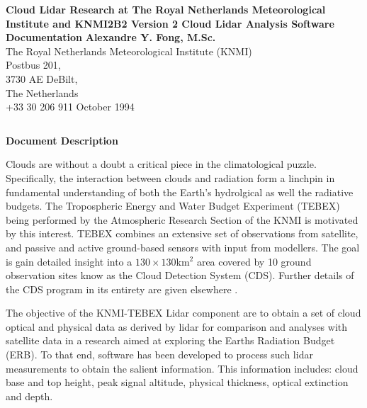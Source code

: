 
%



\setcounter{page}{3}
\pagestyle {empty}
$\;$
\begin {center}
\vspace{2 cm}
{\Large\bf
Cloud Lidar Research at The Royal Netherlands Meteorological Institute
and KNMI2B2 Version 2 Cloud Lidar Analysis Software Documentation}
\vfill
{\large \bf Alexandre Y. Fong, M.Sc.}\\
\vfill
\vfill
{\large The Royal Netherlands Meteorological Institute (KNMI)}\\
\vfill
{\large Postbus 201,\\
	3730 AE DeBilt,\\
	The Netherlands}\\
{\large +33 30 206 911}
\vfill
\vfill
{\large October 1994} \\
\end {center}
\vspace {1 cm}
$\;$
\clearpage

\pagestyle {headings}
\begin {Large}
\begin {center}
{\bf Document Description}
\end {center}
\end {Large}
\vspace{1 cm}

Clouds are without a doubt a critical piece in the climatological puzzle.
Specifically, the interaction between clouds and radiation form a
linchpin in fundamental understanding of both the
Earth's hydrolgical as well the radiative budgets. The Tropospheric
Energy and Water Budget Experiment (TEBEX) being performed by the
Atmospheric Research Section of the KNMI is motivated by this
interest. TEBEX combines an extensive set of observations from 
satellite, and passive and active ground-based sensors with input
from modellers. The goal is gain detailed insight into a 
$130{\times}130$km$^{2}$
area covered by 10 ground observation sites know as the Cloud Detection
System (CDS). Further details of the CDS program in its entirety are
given elsewhere \cite{psajfacapvlgjp}. 

The objective of the KNMI-TEBEX Lidar component are to obtain a set of cloud
optical and physical data as derived by lidar for comparison and analyses
with satellite data in a research aimed at exploring the Earths Radiation
Budget (ERB). To that end, software has been developed to 
process such lidar measurements to obtain the salient information.
This information includes: cloud base and top height, peak signal altitude,
physical thickness, optical extinction and depth. 

